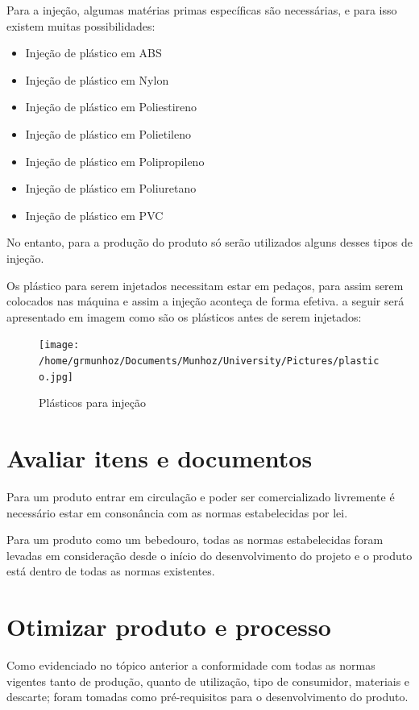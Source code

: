 \documentclass[
	12pt,				%
	openright,			%
	oneside,			%
	a4paper,			%
	english,			%
	french,				%
	spanish,			%
	brazil				%
	]{abntex2}
\begin{document}
Para a injeção, algumas matérias primas específicas são necessárias, e para isso existem muitas possibilidades:

\begin{itemize}
\item Injeção de plástico em ABS
\item Injeção de plástico em Nylon
\item Injeção de plástico em Poliestireno
\item Injeção de plástico em Polietileno
\item Injeção de plástico em Polipropileno
\item Injeção de plástico em Poliuretano
\item Injeção de plástico em PVC
\end{itemize}

No entanto, para a produção do produto só serão utilizados alguns desses tipos de injeção.

Os plástico para serem injetados necessitam estar em pedaços, para assim serem colocados nas máquina e assim a injeção aconteça de forma efetiva. a seguir será apresentado em imagem como são os plásticos antes de serem injetados:

\begin{figure}[H]
\begin{center}
\caption{Plásticos para injeção}
\texttt{[image: /home/grmunhoz/Documents/Munhoz/University/Pictures/plastico.jpg]} 
\label{figetapas}
\end{center}
\end{figure}


\section{Avaliar itens e documentos}

Para um produto entrar em circulação e poder ser comercializado livremente é necessário estar em consonância com as normas estabelecidas por lei.

Para um produto como um bebedouro, todas as normas estabelecidas foram levadas em consideração desde o início do desenvolvimento do projeto e o produto está dentro de todas as normas existentes.


\section{Otimizar produto e processo}

Como evidenciado no tópico anterior a conformidade com todas as normas vigentes tanto de produção, quanto de utilização, tipo de consumidor, materiais e descarte; foram tomadas como pré-requisitos para o desenvolvimento do produto.
\end{document}
